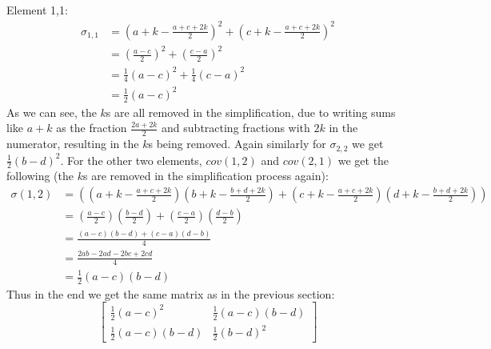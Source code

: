 \documentclass[10pt]{article}
\begin{document}
\subsection{}
Element 1,1:
\begin{align}
\sigma_{1,1} & = (a+k-\frac{a+c+2k}{2})^2+(c+k-\frac{a+c+2k}{2})^2 \\
& = (\frac{a-c}{2})^2 + (\frac{c-a}{2})^2 \\
& = \frac{1}{4}(a-c)^2 + \frac{1}{4}(c-a)^2 \\
& = \frac{1}{2}(a-c)^2
\end{align}
As we can see, the $k$s are all removed in the simplification, due to writing sums like $a+k$ as the fraction $\frac{2a+2k}{2}$ and subtracting fractions with $2k$ in the numerator, resulting in the $k$s being removed.
Again similarly for $\sigma_{2,2}$ we get $\frac{1}{2}(b-d)^2$.
For the other two elements, $cov(1,2)$ and $cov(2,1)$ we get the following (the $k$s are removed in the simplification process again):
\begin{align}
\sigma(1,2) & = ((a+k-\frac{a+c+2k}{2})(b+k-\frac{b+d+2k}{2})+(c+k-\frac{a+c+2k}{2})(d+k-\frac{b+d+2k}{2})) \\
& = (\frac{a-c}{2}) (\frac{b-d}{2}) + (\frac{c-a}{2}) (\frac{d-b}{2}) \\
& = \frac{(a-c)(b-d) + (c-a)(d-b)}{4} \\
& = \frac{2ab - 2ad - 2bc + 2cd}{4} \\
& = \frac{1}{2} (a-c)(b-d)
\end{align}
Thus in the end we get the same matrix as in the previous section:
\begin{equation}
    \begin{bmatrix}
      \frac{1}{2}(a-c)^2 & \frac{1}{2} (a-c)(b-d)\\
      \frac{1}{2} (a-c)(b-d) & \frac{1}{2}(b-d)^2
    \end{bmatrix}
\end{equation}
\end{document}
